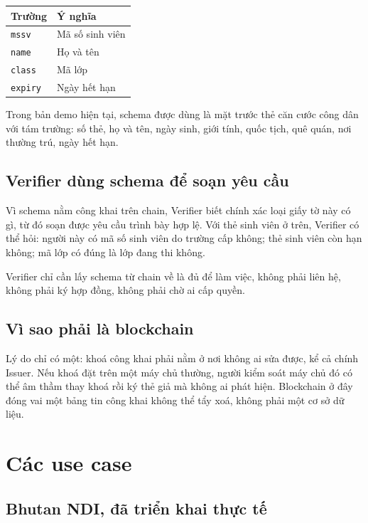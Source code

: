 \documentclass[a4paper,11pt,oneside]{report}
\theoremstyle{definition}
\theoremstyle{plain}
\begin{document}
\begin{center}
\begin{tabular}{@{}ll@{}}
\toprule
\textbf{\sffamily Trường} & \textbf{\sffamily Ý nghĩa} \\
\midrule
\texttt{mssv} & Mã số sinh viên \\
\texttt{name} & Họ và tên \\
\texttt{class} & Mã lớp \\
\texttt{expiry} & Ngày hết hạn \\
\bottomrule
\end{tabular}
\end{center}

Trong bản demo hiện tại, schema được dùng là mặt trước thẻ căn cước công dân với tám trường: số
thẻ, họ và tên, ngày sinh, giới tính, quốc tịch, quê quán, nơi thường trú, ngày hết hạn.

\section{Verifier dùng schema để soạn yêu cầu}

Vì schema nằm công khai trên chain, Verifier biết chính xác loại giấy tờ này có gì,
từ đó soạn được yêu cầu trình bày hợp lệ. Với thẻ sinh viên ở trên, Verifier có thể
hỏi: người này có mã số sinh viên do trường cấp không; thẻ sinh viên còn hạn không; mã lớp có
đúng là lớp đang thi không.

Verifier chỉ cần lấy schema từ chain về là đủ để làm việc, không phải liên hệ, không phải ký
hợp đồng, không phải chờ ai cấp quyền.

\section{Vì sao phải là blockchain}

Lý do chỉ có một: khoá công khai phải nằm ở nơi không ai sửa được, kể cả chính
Issuer. Nếu khoá đặt trên một máy chủ thường, người kiểm soát máy chủ đó có thể âm
thầm thay khoá rồi ký thẻ giả mà không ai phát hiện. Blockchain ở đây đóng vai một bảng tin công
khai không thể tẩy xoá, không phải một cơ sở dữ liệu.

\chapter{Các use case}

\section{Bhutan NDI, đã triển khai thực tế}
\end{document}

